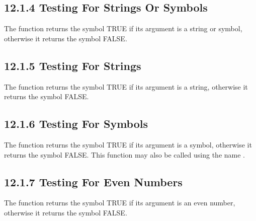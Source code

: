 \documentclass[letterpaper,10pt,english]{sphinxmanual}
\begin{document}
\subsection{12.1.4 Testing For Strings Or Symbols}
\label{\detokenize{actions:testing-for-strings-or-symbols}}
The  function returns the symbol TRUE if its argument is a
string or symbol, otherwise it returns the symbol FALSE.


\begin{sphinxVerbatim}[commandchars=\\\{\}]
 
\end{sphinxVerbatim}


\subsection{12.1.5 Testing For Strings}
\label{\detokenize{actions:testing-for-strings}}
The  function returns the symbol TRUE if its argument is a
string, otherwise it returns the symbol FALSE.


\begin{sphinxVerbatim}[commandchars=\\\{\}]
 
\end{sphinxVerbatim}


\subsection{12.1.6 Testing For Symbols}
\label{\detokenize{actions:testing-for-symbols}}
The  function returns the symbol TRUE if its argument is a
symbol, otherwise it returns the symbol FALSE. This function may also be
called using the name .


\begin{sphinxVerbatim}[commandchars=\\\{\}]
 
\end{sphinxVerbatim}


\subsection{12.1.7 Testing For Even Numbers}
\label{\detokenize{actions:testing-for-even-numbers}}
The  function returns the symbol TRUE if its argument is an
even number, otherwise it returns the symbol FALSE.
\end{document}
